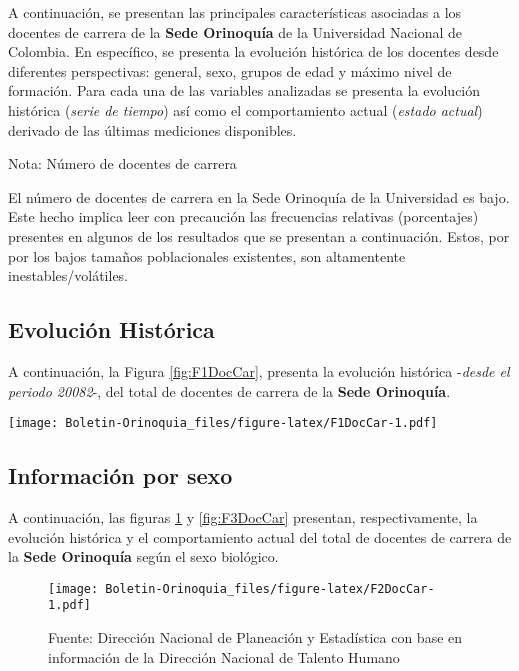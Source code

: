\documentclass[
]{book}
\begin{document}
A continuación, se presentan las principales características asociadas a los docentes de carrera de la \textbf{Sede Orinoquía} de la Universidad Nacional de Colombia. En específico, se presenta la evolución histórica de los docentes desde diferentes perspectivas: general, sexo, grupos de edad y máximo nivel de formación. Para cada una de las variables analizadas se presenta la evolución histórica (\emph{serie de tiempo}) así como el comportamiento actual (\emph{estado actual}) derivado de las últimas mediciones disponibles.

Nota: Número de docentes de carrera

El número de docentes de carrera en la Sede Orinoquía de la Universidad es bajo. Este hecho implica leer con precaución las frecuencias relativas (porcentajes) presentes en algunos de los resultados que se presentan a continuación. Estos, por por los bajos tamaños poblacionales existentes, son altamentente inestables/volátiles.

\hypertarget{evoluciuxf3n-histuxf3rica-6}{%
\subsection{Evolución Histórica}\label{evoluciuxf3n-histuxf3rica-6}}

A continuación, la Figura \ref{fig:F1DocCar}, presenta la evolución histórica -\emph{desde el periodo 20082}-, del total de docentes de carrera de la \textbf{Sede Orinoquía}.

\texttt{[image: Boletin-Orinoquia\_files/figure-latex/F1DocCar-1.pdf]}

\hypertarget{informaciuxf3n-por-sexo-6}{%
\subsection{Información por sexo}\label{informaciuxf3n-por-sexo-6}}

A continuación, las figuras \ref{fig:F2DocCar} y \ref{fig:F3DocCar} presentan, respectivamente, la evolución histórica y el comportamiento actual del total de docentes de carrera de la \textbf{Sede Orinoquía} según el sexo biológico.

\begin{figure}
\centering
\texttt{[image: Boletin-Orinoquia\_files/figure-latex/F2DocCar-1.pdf]}
\caption{\label{fig:F2DocCar}Fuente: Dirección Nacional de Planeación y Estadística con base en información de la Dirección Nacional de Talento Humano}
\end{figure}
\end{document}
